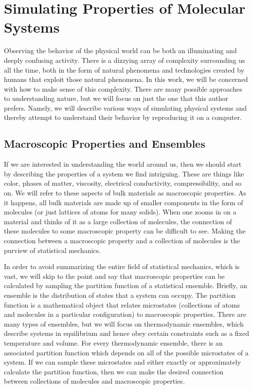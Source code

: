 \documentclass[11pt, proquest]{uwthesis}[2020/02/24]
\begin{document}
\textpages

\chapter{Simulating Properties of Molecular Systems}

Observing the behavior of the physical world can be both an illuminating and deeply confusing activity. There is a dizzying array of complexity surrounding us all the time, both in the form of natural phenomena and technologies created by humans that exploit those natural phenomena. In this work, we will be concerned with how to make sense of this complexity. There are many possible approaches to understanding nature, but we will focus on just the one that this author prefers. Namely, we will describe various ways of simulating physical systems and thereby attempt to understand their behavior by reproducing it on a computer.

\section{Macroscopic Properties and Ensembles}

If we are interested in understanding the world around us, then we should start by describing the properties of a system we find intriguing. These are things like color, phases of matter, viscosity, electrical conductivity, compressibility, and so on. We will refer to these aspects of bulk materials as macroscopic properties. As it happens, all bulk materials are made up of smaller components in the form of molecules (or just lattices of atoms for many solids). When one zooms in on a material and thinks of it as a large collection of molecules, the connection of these molecules to some macroscopic property can be difficult to see. Making the connection between a macroscopic property and a collection of molecules is the purview of statistical mechanics.\autocite{tuckerman_statistical_2010}

\par In order to avoid summarizing the entire field of statistical mechanics, which is vast, we will skip to the point and say that macroscopic properties can be calculated by sampling the partition function of a statistical ensemble. Briefly, an ensemble is the distribution of states that a system can occupy. The partition function is a mathematical object that relates microstates (collections of atoms and molecules in a particular configuration) to macroscopic properties. There are many types of ensembles, but we will focus on thermodynamic ensembles, which describe systems in equilibrium and hence obey certain constraints such as a fixed temperature and volume. For every thermodynamic ensemble, there is an associated partition function which depends on all of the possible microstates of a system. If we can sample these microstates and either exactly or approximately calculate the partition function, then we can make the desired connection between collections of molecules and macroscopic properties.
\end{document}

